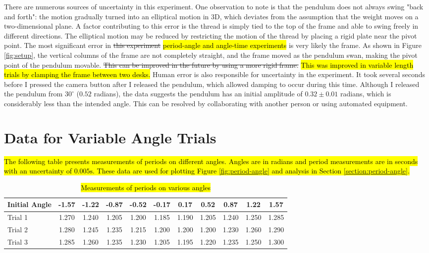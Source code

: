 \documentclass[12pt]{article}
\DeclareRobustCommand{\hlnew}[1]{{\sethlcolor{hlcnew}\hl{#1}}}
\DeclareRobustCommand{\hldel}[1]{{\st{#1}}}
\begin{document}
There are numerous sources of uncertainty in this experiment. One observation to note is that the pendulum does not always swing "back and forth": the motion gradually turned into an elliptical motion in 3D, which deviates from the assumption that the weight moves on a two-dimensional plane. A factor contributing to this error is the thread is simply tied to the top of the frame and able to swing freely in different directions. The elliptical motion may be reduced by restricting the motion of the thread by placing a rigid plate near the pivot point. The most significant error in \hldel{this experiment} \hlnew{period-angle and angle-time experiments} is very likely the frame. As shown in Figure \ref{fig:setup}, the vertical columns of the frame are not completely straight, and the frame moved as the pendulum swan, making the pivot point of the pendulum movable. \hldel{This can be improved in the future by using a more rigid frame.} \hlnew{This was improved in variable length trials by clamping the frame between two desks.} Human error is also responsible for uncertainty in the experiment. It took several seconds before I pressed the camera button after I released the pendulum, which allowed damping to occur during this time. Although I released the pendulum from $30^\circ$ ($0.52$ radians), the data suggests the pendulum has an initial amplitude of $0.32\pm0.01$ radians, which is considerably less than the intended angle. This can be resolved by collaborating with another person or using automated equipment.






\newpage
\appendix


\section{Data for Variable Angle Trials} \label{appendix:period-angle}

\hlnew{The following table presents measurements of periods on different angles. Angles are in radians and period measurements are in seconds with an uncertainty of $0.005\mathrm{s}$. These data are used for plotting Figure {\ref{fig:period-angle}} and analysis in Section {\ref{section:period-angle}}.}

\begin{table}[h]
\begin{tabularx}{\textwidth}{ |X|c|c|c|c|c|c|c|c|c|c| }
\hline
Initial Angle &
-1.57&-1.22&-0.87&-0.52&-0.17&0.17&0.52&0.87&1.22&1.57
\\ \hline
Trial 1 &
1.270&1.240&1.205&1.200&1.185&1.190&1.205&1.240&1.250&1.285
\\ \hline
Trial 2 &
1.280&1.245&1.235&1.215&1.200&1.200&1.200&1.230&1.260&1.290
\\ \hline
Trial 3 &
1.285&1.260&1.235&1.230&1.205&1.195&1.220&1.235&1.250&1.300
\\ \hline
\end{tabularx}
\caption{\hlnew{Measurements of periods on various angles}}
\label{table:period-angle}
\end{table}
\end{document}
